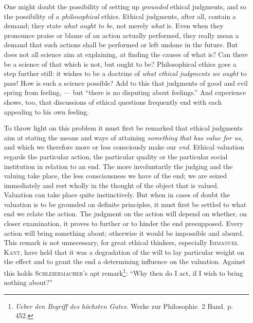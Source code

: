 \documentclass[12pt,a4paper,openany]{book}
\newcommand{\opage}[1]{\marginnote{\footnotesize\textit{[#1]}}}
\begin{document}
One might doubt the possibility of setting up \textit{grounded} ethical judgments, and so the
possibility of a \textit{philosophical} ethics. Ethical judgments, after all, contain a demand; they
state \textit{what ought to be}, not merely \textit{what} is. Even when they pronounce praise or blame
of an action actually performed, they really mean a demand that such actions shall be performed or
left undone in the future. But does not all science aim at explaining, at finding the causes of what
is? Can there be a science of that which is not, but ought to be? Philosophical ethics goes
\opage{23}a step further still: it wishes to be a doctrine of \textit{what ethical judgments we ought} to
pass! How is such a science possible? Add to this that judgments of good and evil spring from
feeling, --- but ``there is no disputing about feelings.'' And experience shows, too, that
discussions of ethical questions frequently end with each appealing to his own feeling.

To throw light on this problem it must first be remarked that ethical judgments aim at stating the
means and ways of attaining \textit{something that has value for us}, and which we therefore more or
less consciously make our \textit{end}. Ethical valuation regards the particular action, the
particular quality or the particular social institution in relation to an end. The more involuntarily
the judging and the valuing take place, the less consciousness we have of the end; we are seized
immediately and rest wholly in the thought of the object that is valued. Valuation can take place
quite instinctively. But when in cases of doubt the valuation is to be grounded on definite
principles, it must first be settled to what end we relate the action. The judgment on the action
will depend on whether, on closer examination, it proves to further or to hinder the end
presupposed. Every action will bring something about; otherwise it would be impossible and absurd.
This remark is not unnecessary, for great ethical thinkers, especially \textsc{Immanuel Kant}, have
held that it was a degradation of the will to lay particular weight on the effect and to grant the
end a determining influence on the valuation. Against this holds \textsc{Schleiermacher}'s apt
remark\footnote[1]{\textit{Ueber den Begriff des höchsten Gutes.} Werke zur Philosophie. 2 Band. p.
452.}: ``Why then do I act, if I wish to bring nothing about?''
\end{document}
